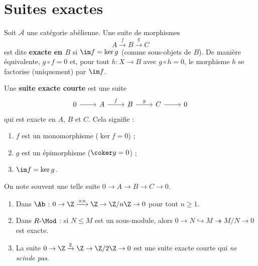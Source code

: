 \section{Suites exactes}\label{sec:exact-sequences}

\begin{definition}\label{def:exact-at}
Soit $\mathcal{A}$ une catégorie abélienne. Une suite de morphismes
\[
  A \xrightarrow{f} B \xrightarrow{g} C
\]
est dite \textbf{exacte en $B$} si $\im f = \ker g$
(comme sous-objets de $B$).
De manière équivalente, $g \circ f = 0$ et, pour tout $h \colon X \to B$
avec $g \circ h = 0$, le morphisme $h$ se factorise (uniquement) par
$\im f$.
\end{definition}

\begin{definition}\label{def:ses}
Une \textbf{suite exacte courte} est une suite
\[
\begin{tikzcd}
0 \arrow[r] & A \arrow[r, "f"] & B \arrow[r, "g"] & C \arrow[r] & 0
\end{tikzcd}
\]
qui est exacte en $A$, $B$ et $C$. Cela signifie :
\begin{enumerate}[label=(\roman*)]
\item $f$ est un monomorphisme ($\ker f = 0$) ;
\item $g$ est un épimorphisme ($\coker g = 0$) ;
\item $\im f = \ker g$.
\end{enumerate}
On note souvent une telle suite $0 \to A \to B \to C \to 0$.
\end{definition}

\begin{exemple}\label{ex:ses-Z}
\begin{enumerate}[label=(\roman*)]
\item Dans $\Ab$ : $0 \to \Z \xrightarrow{\times n} \Z \to \Z/n\Z \to 0$
  pour tout $n \geq 1$.

\item Dans $R\text{-}\Mod$ : si $N \leq M$ est un sous-module, alors
  $0 \to N \hookrightarrow M \twoheadrightarrow M/N \to 0$ est exacte.

\item La suite $0 \to \Z \xrightarrow{2} \Z \to \Z/2\Z \to 0$
  est une suite exacte courte qui \emph{ne scinde pas}.
\end{enumerate}
\end{exemple}

